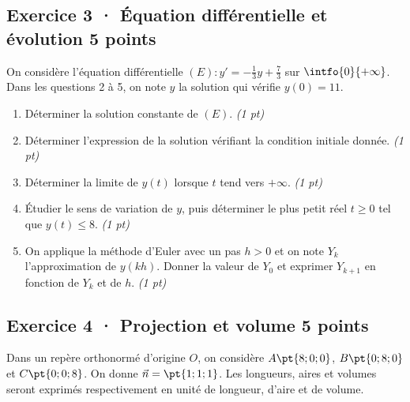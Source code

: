 \mxnewpage{}

\subsection*{Exercice 3 · Équation différentielle et évolution \hfill 5 points}On considère l'équation différentielle $(E):y'=-\frac1{3}y+\frac{7}{3}$ sur $\intfo{0}{+\infty}$. Dans les questions 2 à 5, on note $y$ la solution qui vérifie $y(0)=11$.

\begin{enumerate}

\item Déterminer la solution constante de $(E)$. \hfill\textit{(1 pt)}

\item Déterminer l'expression de la solution vérifiant la condition initiale donnée. \hfill\textit{(1 pt)}

\item Déterminer la limite de $y(t)$ lorsque $t$ tend vers $+\infty$. \hfill\textit{(1 pt)}

\item Étudier le sens de variation de $y$, puis déterminer le plus petit réel $t\ge0$ tel que $y(t)\le8$. \hfill\textit{(1 pt)}

\item On applique la méthode d'Euler avec un pas $h>0$ et on note $Y_k$ l'approximation de $y(kh)$. Donner la valeur de $Y_0$ et exprimer $Y_{k+1}$ en fonction de $Y_k$ et de $h$. \hfill\textit{(1 pt)}

\end{enumerate}

\subsection*{Exercice 4 · Projection et volume \hfill 5 points}Dans un repère orthonormé d'origine $O$, on considère $A\pt{8;0;0}$, $B\pt{0;8;0}$ et $C\pt{0;0;8}$. On donne $\vec n=\pt{1;1;1}$. Les longueurs, aires et volumes seront exprimés respectivement en unité de longueur, d'aire et de volume.

